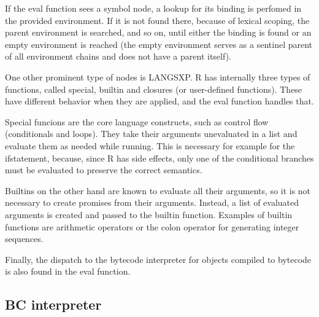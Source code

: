 If the eval function sees a symbol node, a lookup for its binding is perfomed in the provided environment. If it is not found there, because of lexical scoping, the parent environment is searched, and so on, until either the binding is found or an empty environment is reached (the empty environment serves as a sentinel parent of all environment chains and does not have a parent itself).

One other prominent type of nodes is LANGSXP. R has internally three types of functions, called special, builtin and closures (or user-defined functions). These have different behavior when they are applied, and the eval function handles that.

Special funcions are the core language constructs, such as control flow (conditionals and loops). They take their arguments unevaluated in a list and evaluate them as needed while running. This is necessary for example for the if\todo[verb] statement, because, since R has side effects, only one of the conditional branches must be evaluated to preserve the correct semantics.

Builtins on the other hand are known to evaluate all their arguments, so it is not necessary to create promises from their arguments. Instead, a list of evaluated arguments is created and passed to the builtin function. Examples of builtin functions are arithmetic operators or the colon operator for generating integer sequences.



Finally, the dispatch to the bytecode interpreter for objects compiled to bytecode is also found in the eval function.


\subsection{BC interpreter}

